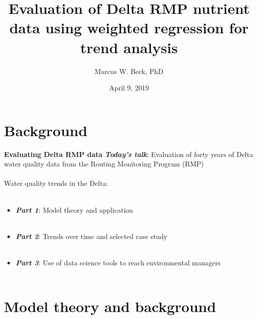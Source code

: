 \documentclass[serif]{beamer}\usepackage[]{graphicx}\usepackage[]{color}
\newcommand{\emtxt}[1]{\textbf{\textit{#1}}}
\begin{document}
\title[Evaluation of Delta RMP data]{\textbf{Evaluation of Delta RMP nutrient data using weighted regression for trend analysis}}
\author[M. Beck]{Marcus W. Beck, PhD}


\date{April 9, 2019}


\begin{frame}[shrink]
\vspace{0.2in}
\titlepage
\end{frame}

\section{Background}

\begin{frame}{\textbf{Evaluating Delta RMP data}}{}
\onslide<+->
\emtxt{Today's talk}: Evaluation of forty years of Delta water quality data from the Routing Monitoring Program (RMP) \\~\\
\onslide<+->
Water quality trends in the Delta: \\~\\
\begin{itemize}
\item \emtxt{Part 1}: Model theory and application \\~\\
\item \emtxt{Part 2}: Trends over time and selected case study \\~\\
\item \emtxt{Part 3}: Use of data science tools to reach environmental managers \\~\\
\end{itemize}
\end{frame}

\section{Model theory and background}
\end{document}
